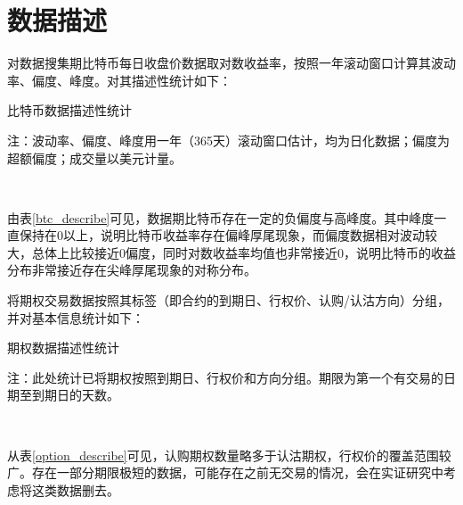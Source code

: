 \section{数据描述}
    \par{
        对数据搜集期比特币每日收盘价数据取对数收益率，按照一年滚动窗口计算其波动率、偏度、峰度。对其描述性统计如下：}

        \begin{threeparttable}[H]
            
            \centering
            \caption{比特币数据描述性统计}
            \label{btc_describe}
            
            \begin{tablenotes}
                \footnotesize
                \item 注：波动率、偏度、峰度用一年（365天）滚动窗口估计，均为日化数据；偏度为超额偏度；成交量以美元计量。
            \end{tablenotes}
        \end{threeparttable}
        
    
    ~\\
    \par{
        
        由表\ref{btc_describe}可见，数据期比特币存在一定的负偏度与高峰度。其中峰度一直保持在0以上，说明比特币收益率存在偏峰厚尾现象，而偏度数据相对波动较大，总体上比较接近0偏度，同时对数收益率均值也非常接近0，说明比特币的收益分布非常接近存在尖峰厚尾现象的对称分布。
    }
    \newpage
    \par{
        将期权交易数据按照其标签（即合约的到期日、行权价、认购/认沽方向）分组，并对基本信息统计如下：
    }
    \par{
    \begin{threeparttable}[H]
        \centering
        \caption{期权数据描述性统计}
        \label{option_describe}
        
        \begin{tablenotes}
            \footnotesize
            \item 注：此处统计已将期权按照到期日、行权价和方向分组。期限为第一个有交易的日期至到期日的天数。
        \end{tablenotes}
    \end{threeparttable}
    }
    ~\\
    \par{
    从表\ref{option_describe}可见，认购期权数量略多于认沽期权，行权价的覆盖范围较广。存在一部分期限极短的数据，可能存在之前无交易的情况，会在实证研究中考虑将这类数据删去。
    }